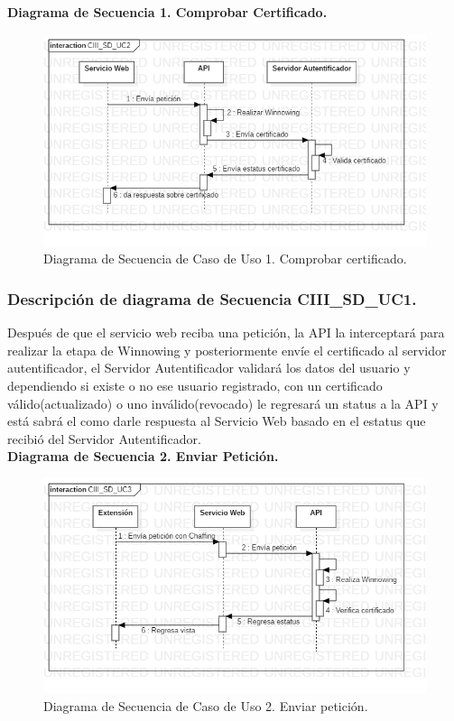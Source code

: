 \documentclass[12pt, a4paper, titlepage]{report}
\begin{document}
                \textbf{Diagrama de Secuencia 1. Comprobar Certificado.} 
                \begin{figure}[H]
                	\begin{center}	\includegraphics[width=12cm]{./imagenes/Disenio/Componente_3/CIII_SD_UC2.png}
                	\caption{Diagrama de Secuencia de Caso de Uso 1. Comprobar certificado.}
                	\end{center}
        		\end{figure}
            
                \subsubsection{Descripción de diagrama de Secuencia CIII\_SD\_UC1.}
                Después de que el servicio web reciba una petición, la API la interceptará para realizar la etapa de Winnowing y posteriormente envíe el certificado al servidor autentificador, el Servidor Autentificador validará los datos del usuario y dependiendo si existe o no ese usuario registrado, con un certificado válido(actualizado) o uno inválido(revocado) le regresará un status a la API y está sabrá el como darle respuesta al Servicio Web basado en el estatus que recibió del Servidor Autentificador.\\
        
                \textbf{Diagrama de Secuencia 2. Enviar Petición.}    
                \begin{figure}[H]
                	\begin{center}	\includegraphics[width=12cm]{./imagenes/Disenio/Componente_3/CIII_SD_UC3.png}
                	\caption{Diagrama de Secuencia de Caso de Uso 2. Enviar petición.}
                	\end{center}
        		\end{figure}
    		
\end{document}
